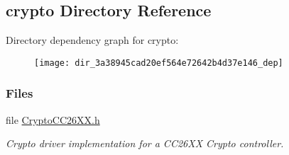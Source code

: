 \subsection{crypto Directory Reference}
\label{dir_3a38945cad20ef564e72642b4d37e146}
Directory dependency graph for crypto\+:
\nopagebreak
\begin{figure}[H]
\begin{center}
\leavevmode
\texttt{[image: dir\_3a38945cad20ef564e72642b4d37e146\_dep]}
\end{center}
\end{figure}
\subsubsection*{Files}
\begin{DoxyCompactItemize}
\item 
file \hyperlink{_crypto_c_c26_x_x_8h}{Crypto\+C\+C26\+X\+X.\+h}
\begin{DoxyCompactList}\small\item\em Crypto driver implementation for a C\+C26\+X\+X Crypto controller. \end{DoxyCompactList}\end{DoxyCompactItemize}
